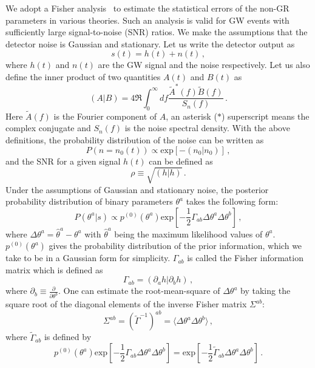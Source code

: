 \documentclass[prd,twocolumn,nofootinbib]{revtex4-1}
\newcommand\be{\begin{equation}}
\newcommand\ee{\end{equation}}
\begin{document}
We adopt a Fisher analysis~\cite{Cutler:1994ys} to estimate the statistical errors of the non-GR parameters in various theories. Such an analysis is valid for GW events with sufficiently large signal-to-noise (SNR) ratios. We make the assumptions that the detector noise is Gaussian and stationary. Let us write the detector output as
\be
s(t)=h(t)+n(t)\,,
\ee
where $h(t)$ and $n(t)$ are the GW signal and the noise respectively. Let us also define the inner product of two quantities $A(t)$ and $B(t)$ as
 \be
 \left(A|B\right)=4\Re\int_0^\infty df \frac{\tilde{A}^*(f)\tilde{B}(f)}{S_n \left( f \right)}\,.
 \ee
Here $\tilde{A}(f)$ is the Fourier component of $A$, an asterisk ($*$) superscript means the complex conjugate and $S_n\left(f\right)$ is the noise spectral density. With the above definitions, the probability distribution of the noise can be written as
 \be
P\left(n=n_0(t)\right) \propto \text{exp}\left[-\left(n_0|n_0\right)\right]\,,
\ee
and the SNR for a given signal $h(t)$ can be defined as
\be
\rho \equiv\sqrt{\left(h|h\right)}\,.
\ee
Under the assumptions of Gaussian and stationary noise, the posterior probability distribution of binary parameters $\theta^a$ takes the following form:
\be
P\left(\theta^a|s\right) \propto p^{(0)}\left(\theta^a\right) \text{exp}\left[-\frac{1}{2} \Gamma_{ab} \Delta\theta^a\Delta \theta^b \right]\,,
\ee
where $\Delta \theta^a=\hat{\theta}^a-\theta^a$ with $\hat{\theta}^a$ being the maximum likelihood values of $\theta^a$. $p^{(0)}\left(\theta^a\right)$ gives the probability distribution of the prior information, which we take to be in a Gaussian form for simplicity. $\Gamma_{ab}$ is called the Fisher information matrix which is defined as
\be
\Gamma_{ab}=\left(\partial_a h|\partial_b h \right)\,,
\ee
where $\partial_b\equiv \frac{\partial}{\partial \theta^b}$. One can estimate the root-mean-square of $\Delta \theta^a$ by taking the square root of the diagonal elements of the inverse Fisher matrix $\Sigma^{ab}$: 
\be
\Sigma^{ab}=\left(\tilde{\Gamma}^{-1}\right)^{ab}=\langle\Delta\theta^a\Delta \theta^b\rangle\,,
\ee
where $\tilde{\Gamma}_{ab}$ is defined by
\be
p^{(0)}\left(\theta^a\right) \text{exp}\left[-\frac{1}{2} \Gamma_{ab} \Delta\theta^a\Delta \theta^b \right]=\text{exp}\left[-\frac{1}{2} \tilde{\Gamma}_{ab} \Delta\theta^a\Delta \theta^b \right]\,.
\ee
\end{document}
